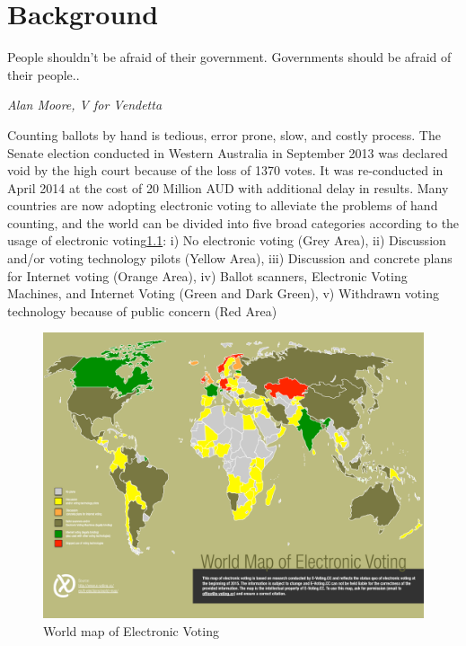 \chapter{Background}
\label{cha:background}

\epigraph{People shouldn't be afraid of their government. Governments should be afraid of their people..} 
{\textit{Alan Moore, V for Vendetta }}
  Counting ballots by hand is tedious, error prone, slow, and costly process. 
  The Senate election conducted in Western Australia in September 2013 was 
  declared void by the high court because of the loss of 1370 votes. It was 
  re-conducted in April 2014 at the cost of 20 Million 
  AUD with additional  delay in results\citep{Aussentate}. Many countries 
  are now adopting electronic voting to alleviate the problems of hand counting, and 
  the world can be divided into five broad categories according to 
  the usage of electronic voting\citep{Evoting}\ref{fig:world_electronic_voting_map}: i) No electronic 
  voting (Grey Area), ii)
  Discussion and/or voting technology pilots (Yellow Area), 
  iii) Discussion and concrete plans for Internet voting (Orange Area),
  iv) Ballot scanners, Electronic Voting Machines, and Internet Voting (Green and Dark Green),
  v) Withdrawn voting technology because of public concern (Red Area) 
    \begin{figure}[htb]
	\begin{center}
	\includegraphics[scale=0.5]{e-voting_worldmap_2015.pdf}
	\caption{World map of Electronic Voting}
	\label{fig:world_electronic_voting_map}
	\end{center}
  \end{figure}  
 
